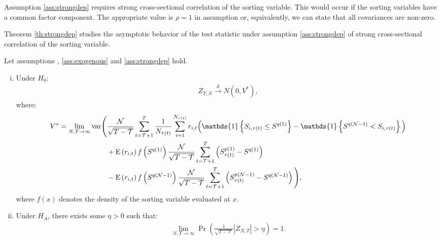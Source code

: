 \noindent
Assumption \ref{ass:strongdep} requires strong cross-sectional correlation of the sorting variable. This would occur if the sorting variables have a common factor component. The appropriate value is $\rho=1$ in assumption  or, equivalently, we can state that all covariances are non-zero.

Theorem \ref{th:strongdep} studies the asymptotic behavior of the test statistic under assumption \ref{ass:strongdep} of strong cross-sectional correlation of the sorting variable.
\begin{theorem}
\label{th:strongdep} Let assumptions , \ref{ass:exogenous} and \ref{ass:strongdep} hold.

\begin{enumerate}[(i)]
\item Under $H_{0}$:
\begin{align*}
    Z_{T,N} \overset{d}{\rightarrow }N(0,V^{\ast }),
\end{align*}
where: 
\begin{align*}
    V^{\ast } = \lim_{N,T\rightarrow \infty } \mathrm{var} \Bigg( &\frac{\mathcal{N}}{\sqrt{T-\mathcal{T}}}\sum_{t=\mathcal{T}+1}^{T}\frac{1}{N_{\tau(t)}} \sum_{i=1}^{N_{\tau(t)}} r_{i,t} \Big(\mathds{1}\left\{ S_{i,\tau(t) } \leq S^{q(1)}\right\} - \mathds{1}\left\{ S^{q(\mathcal{N} -1)} < S_{i,\tau(t) }\right\} \Big) \\
    &+ \mathrm{E}\left( r_{i,t}\right) f \left( S^{q(1)}\right) \frac{\mathcal{N}}{\sqrt{T - \mathcal{T}}} \sum_{t=\mathcal{T}+ 1}^{T} \left( S_{\tau(t)}^{p(1)}-S^{q(1)}\right) \\
    &- \mathrm{E}\left( r_{i,t}\right) f\left( S^{q(\mathcal{N}-1)}\right) \frac{\mathcal{N}}{\sqrt{T - \mathcal{T}}}\sum_{t=\mathcal{T}+ 1}^{T} \left( S_{\tau(t)}^{p(\mathcal{N}-1)} - S^{q(\mathcal{N}-1)} \right) \Bigg), \notag
\end{align*}
where $f\left( x \right) $ denotes the density of the sorting variable evaluated at $x$.

\item Under $H_{A}$, there exists some $\eta >0$ such that:
\begin{align*}
    \lim_{N,T\rightarrow \infty }\Pr \left( \frac{1}{\sqrt{T - \mathcal{T}}} \left\vert Z_{N,T} \right\vert > \eta \right) =1.
\end{align*}
\end{enumerate}
\end{theorem}

